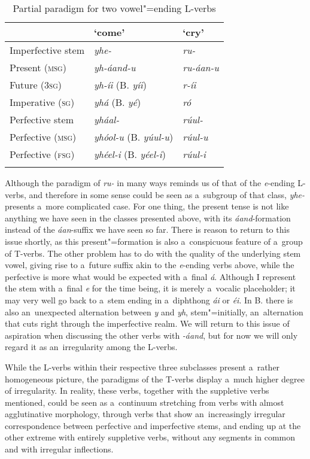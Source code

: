\begin{table}[ht]
\caption{Partial paradigm for two vowel"=ending L-verbs}
\begin{tabularx}{\textwidth}{ Q Q Q }
\lsptoprule
&
`come' &
`cry'\\\hline
Imperfective stem &
\textit{yhe-} &
\textit{ru-} \\
Present (\textsc{msg}) &
\textit{yh-áand-u} &
\textit{ru-áan-u} \\
Future (\textsc{3sg}) &
\textit{yh-íi} (B. \textit{yíi}) &
\textit{r-íi} \\
Imperative (\textsc{sg}) &
\textit{yhá} (B. \textit{yé}) &
\textit{ró} \\
Perfective stem &
\textit{yháal-} &
\textit{rúul-} \\
Perfective (\textsc{msg}) &
\textit{yhóol-u} (B. \textit{yúul-u}) &
\textit{rúul-u} \\
Perfective (\textsc{fsg}) &
\textit{yhéel-i} (B. \textit{yéel-i}) &
\textit{rúul-i} \\\lspbottomrule
\end{tabularx}
\label{tab:8-7}
\end{table}


Although the paradigm of \textit{ru- }in many ways reminds us of that of the \textit{e}-ending L-verbs, and therefore in some sense could be seen as a~subgroup of that class, \textit{yhe-} presents a~more complicated case. For one thing, the present tense is not like anything we have seen in the classes presented above, with its \textit{áand}-formation instead of the \textit{áan}-suffix we have seen so far. There is reason to return to this issue shortly, as this present"=formation is also a~conspicuous feature of a~group of T-verbs. The other problem has to do with the quality of the underlying stem vowel, giving rise to a~future suffix akin to the \textit{e}-ending verbs above, while the perfective is more what would be expected with a~final \textit{á}. Although I represent the stem with a~final \textit{e} for the time being, it is merely a~vocalic placeholder; it may very well go back to a~stem ending in a~diphthong \textit{ái} or \textit{éi}. In B. there is also an~unexpected alternation between \textit{y} and \textit{yh}, stem"=initially, an~alternation that cuts right through the imperfective realm. We will return to this issue of aspiration when discussing the other verbs with \textit{-áand}, but for now we will only regard it as an~irregularity among the L-verbs.


While the L-verbs within their respective three subclasses present a~rather homogeneous picture, the paradigms of the T-verbs display a~much higher degree of irregularity. In reality, these verbs, together with the suppletive verbs mentioned, could be seen as a~continuum stretching from verbs with almost agglutinative morphology, through verbs that show an~increasingly irregular correspondence between perfective and imperfective stems, and ending up at the other extreme with entirely suppletive verbs, without any segments in common and with irregular inflections. 


